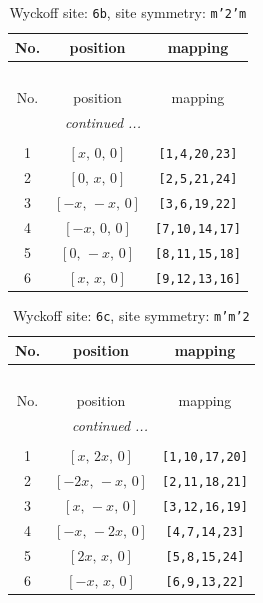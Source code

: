 \documentclass[fleqn,8pt]{jsarticle}
\begin{document}
\begin{longtable}{ccc}
\caption{Wyckoff site: {\tt 6b}, site symmetry: {\tt m'2'm}}
 \\
 \hline \hline
No. & position & mapping \\ \hline \endfirsthead

\multicolumn{2}{l}{\tablename\ \thetable{}} \\
 \hline \hline
No. & position & mapping \\ \hline \endhead

 \hline \hline
\multicolumn{2}{r}{\footnotesize\it continued ...} \\ \endfoot

 \hline \hline
\multicolumn{2}{r}{} \\ \endlastfoot

1 & $\left[ x,\, 0,\, 0 \right]$ & {\tt [1,4,20,23]} \\ \hline
2 & $\left[ 0,\, x,\, 0 \right]$ & {\tt [2,5,21,24]} \\ \hline
3 & $\left[ - x,\, - x,\, 0 \right]$ & {\tt [3,6,19,22]} \\ \hline
4 & $\left[ - x,\, 0,\, 0 \right]$ & {\tt [7,10,14,17]} \\ \hline
5 & $\left[ 0,\, - x,\, 0 \right]$ & {\tt [8,11,15,18]} \\ \hline
6 & $\left[ x,\, x,\, 0 \right]$ & {\tt [9,12,13,16]} \\
\end{longtable}
\renewcommand{\arraystretch}{1.2}
\begin{longtable}{ccc}
\caption{Wyckoff site: {\tt 6c}, site symmetry: {\tt m'm'2}}
 \\
 \hline \hline
No. & position & mapping \\ \hline \endfirsthead

\multicolumn{2}{l}{\tablename\ \thetable{}} \\
 \hline \hline
No. & position & mapping \\ \hline \endhead

 \hline \hline
\multicolumn{2}{r}{\footnotesize\it continued ...} \\ \endfoot

 \hline \hline
\multicolumn{2}{r}{} \\ \endlastfoot

1 & $\left[ x,\, 2 x,\, 0 \right]$ & {\tt [1,10,17,20]} \\ \hline
2 & $\left[ - 2 x,\, - x,\, 0 \right]$ & {\tt [2,11,18,21]} \\ \hline
3 & $\left[ x,\, - x,\, 0 \right]$ & {\tt [3,12,16,19]} \\ \hline
4 & $\left[ - x,\, - 2 x,\, 0 \right]$ & {\tt [4,7,14,23]} \\ \hline
5 & $\left[ 2 x,\, x,\, 0 \right]$ & {\tt [5,8,15,24]} \\ \hline
6 & $\left[ - x,\, x,\, 0 \right]$ & {\tt [6,9,13,22]} \\
\end{longtable}
\end{document}
